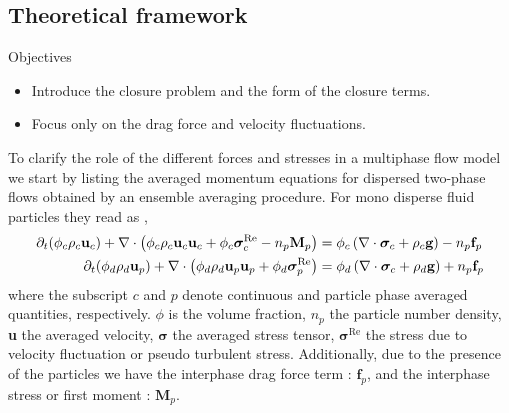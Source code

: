 \subsection{Theoretical framework}
Objectives
\begin{itemize}
    \item Introduce the closure problem and the form of the closure terms. 
    \item Focus only on the drag force and velocity fluctuations. 
\end{itemize}
To clarify the role of the different forces and stresses in a multiphase flow model we start by listing the averaged momentum equations for dispersed two-phase flows obtained by an ensemble averaging procedure.
For mono disperse fluid particles they read as \citep{zhang1997momentum,jackson1997locally},
\begin{align}
    \partial_t (\phi_c\rho_c \textbf{u}_c)
    + \mathbf{\nabla} \cdot \left(\phi_c\rho_c \textbf{u}_c\textbf{u}_c + \phi_c  \bm{\sigma}_c^{\text{Re}} - n_p\textbf{M}_p \right)
    &= \phi_c 
    \left(\mathbf{\nabla} \cdot \bm{\sigma}_c
    + \rho_c \textbf{g}\right)
    - n_p \textbf{f}_p 
    \label{eq:dt_uc}
    \\
    \partial_t (\phi_d\rho_d \textbf{u}_p)
    + \mathbf{\nabla} \cdot \left(\phi_d\rho_d \textbf{u}_p\textbf{u}_p+ \phi_d \bm{\sigma}_p^{\text{Re}}\right)
    &= 
    \phi_d \left(\mathbf{\nabla} \cdot \bm{\sigma}_c
    + \rho_d \textbf{g}\right)
    + n_p \textbf{f}_p 
    \label{eq:dy_up}
\end{align}
where the subscript $c$ and $p$ denote continuous and particle phase averaged quantities, respectively.
$\phi$ is the volume fraction, $n_p$ the particle number density, \textbf{u} the averaged velocity, $\bm{\sigma}$ the averaged stress tensor, $\bm{\sigma}^{\text{Re}}$ the stress due to velocity fluctuation or pseudo turbulent stress.
Additionally, due to the presence of the particles we have the interphase drag force term : $\textbf{f}_p$, and the interphase stress or first moment : $\textbf{M}_p$. 


